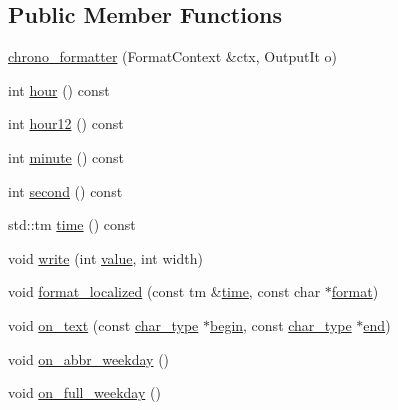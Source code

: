 \subsection*{Public Member Functions}
\begin{DoxyCompactItemize}
\item 
\hyperlink{structinternal_1_1chrono__formatter_aac86bbd630e23c1b073179ba82d6cdb2}{chrono\+\_\+formatter} (Format\+Context \&ctx, Output\+It o)
\item 
int \hyperlink{structinternal_1_1chrono__formatter_a91d13ec0f969481e287c6e813b28bd6d}{hour} () const
\item 
int \hyperlink{structinternal_1_1chrono__formatter_a93a043750e6942332112e7210c517804}{hour12} () const
\item 
int \hyperlink{structinternal_1_1chrono__formatter_ad177f1fef4a92b6a96957ecd6c9dcf16}{minute} () const
\item 
int \hyperlink{structinternal_1_1chrono__formatter_ab026333785c1f7bb169ba5d59ca90e34}{second} () const
\item 
std\+::tm \hyperlink{structinternal_1_1chrono__formatter_aa3b7815dd885ba3a84aa304a34f25079}{time} () const
\item 
void \hyperlink{structinternal_1_1chrono__formatter_a868a76a4e13f979b43fba28c249959b5}{write} (int \hyperlink{classinternal_1_1value}{value}, int width)
\item 
void \hyperlink{structinternal_1_1chrono__formatter_a1466a3d30fb07c336e5ba5239482d8ec}{format\+\_\+localized} (const tm \&\hyperlink{structinternal_1_1chrono__formatter_aa3b7815dd885ba3a84aa304a34f25079}{time}, const char $\ast$\hyperlink{locale_8h_a4d9ddd9260f49d99308d41580d169bd2}{format})
\item 
void \hyperlink{structinternal_1_1chrono__formatter_aaae159c7a01320f53cf0ce746fc855ea}{on\+\_\+text} (const \hyperlink{structinternal_1_1chrono__formatter_a48a141d8bc5a48a0c24e19780ba65512}{char\+\_\+type} $\ast$\hyperlink{namespaceinternal_a265f36d9dee68d3f44381347ef2fd5cb}{begin}, const \hyperlink{structinternal_1_1chrono__formatter_a48a141d8bc5a48a0c24e19780ba65512}{char\+\_\+type} $\ast$\hyperlink{namespaceinternal_a94820de1710dc8038fa6f188adfe299b}{end})
\item 
void \hyperlink{structinternal_1_1chrono__formatter_ae4ff1cb66bff2a9bd2b01e8f560cb7d5}{on\+\_\+abbr\+\_\+weekday} ()
\item 
void \hyperlink{structinternal_1_1chrono__formatter_a0cc88bff82e826562f7870c4ef11ab02}{on\+\_\+full\+\_\+weekday} ()
\item 

\end{DoxyCompactItemize}
